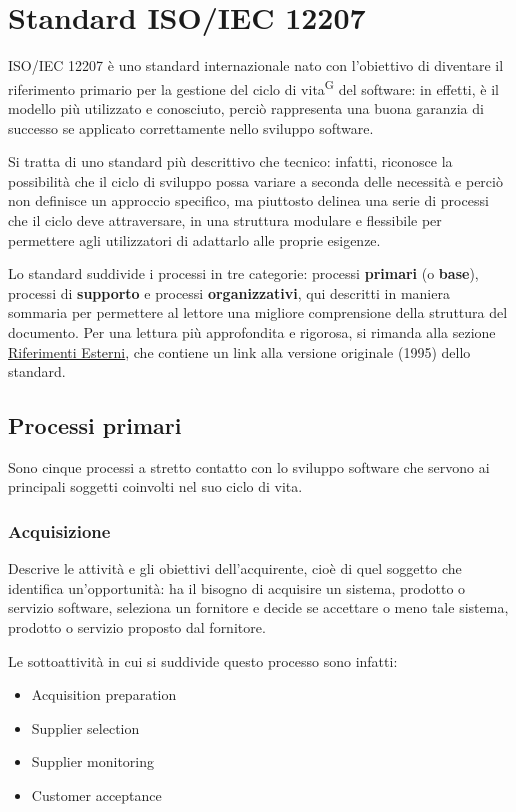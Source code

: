 \newpage
\newpage
\section{Standard ISO/IEC 12207}\label{sec:standard_iso/iec_12207}
ISO/IEC 12207 è uno standard internazionale nato con l'obiettivo di diventare il riferimento primario per la gestione del ciclo di vita\textsuperscript{G} del software: in effetti, è il modello più utilizzato e conosciuto, perciò rappresenta una buona garanzia di successo se applicato correttamente nello sviluppo software.
\par Si tratta di uno standard più descrittivo che tecnico: infatti, riconosce la possibilità che il ciclo di sviluppo possa variare a seconda delle necessità e perciò non definisce un approccio specifico, ma piuttosto delinea una serie di processi che il ciclo deve attraversare, in una struttura modulare e flessibile per permettere agli utilizzatori di adattarlo alle proprie esigenze.
\par Lo standard suddivide i processi in tre categorie: processi \textbf{primari} (o \textbf{base}), processi di \textbf{supporto} e processi \textbf{organizzativi}, qui descritti in maniera sommaria per permettere al lettore una migliore comprensione della struttura del documento. Per una lettura più approfondita e rigorosa, si rimanda alla sezione \hyperref[sec:riferimenti_esterni]{Riferimenti Esterni}, che contiene un link alla versione originale (1995) dello standard.

\subsection{Processi primari}
Sono cinque processi a stretto contatto con lo sviluppo software che servono ai principali soggetti coinvolti nel suo ciclo di vita.
\subsubsection{Acquisizione}
Descrive le attività e gli obiettivi dell'acquirente, cioè di quel soggetto che identifica un'opportunità: ha il bisogno di acquisire un sistema, prodotto o servizio software, seleziona un fornitore e decide se accettare o meno tale sistema, prodotto o servizio proposto dal fornitore.
\par Le sottoattività in cui si suddivide questo processo sono infatti:
\begin{itemize}
    \item Acquisition preparation
    \item Supplier selection
    \item Supplier monitoring
    \item Customer acceptance
\end{itemize}
